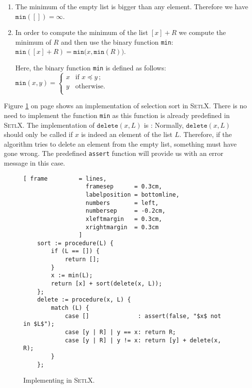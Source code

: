 \begin{enumerate}
\item The minimum of the empty list is bigger than any element.  Therefore we have 
      \\[0.2cm]
      \hspace*{1.3cm} $\mathtt{min}([]) = \infty$.
\item In order to compute the minimum of the list $[x] + R$ we compute the minimum of $R$ and
      then use the binary function \texttt{min}: \\[0.2cm]
      \hspace*{1.3cm} 
      $\mathtt{min}([x] + R) = \mathtt{min}\bigl(x, \mathtt{min}(R) \bigr)$. 

      Here, the binary function \texttt{min} is defined as follows: \\[0.2cm]
      \hspace*{1.3cm} 
      $\mathtt{min}(x,y) = \left\{
      \begin{array}{ll}
        x  & \mbox{if $x \preceq y\,$;} \\
        y  & \mbox{otherwise.} \\
      \end{array}\right.
      $
\end{enumerate}
Figure \ref{fig:selection-sort.setlx} on page \pageref{fig:selection-sort.setlx} shows an
implementation of selection sort in \textsc{SetlX}.  There is no need to implement the function
\texttt{min} as this function is already predefined in \textsc{SetlX}. 
The implementation of $\mathtt{delete}(x,L)$ is :  Normally, $\mathtt{delete}(x, L)$
should only be called if $x$ is indeed an element of the list $L$.   Therefore, if the algorithm tries 
to delete an element from the empty list, something must have gone wrong.  The predefined \texttt{assert}
function will provide us with an error message in this case.


\begin{figure}[!ht]
  \centering
\begin{Verbatim}[ frame         = lines, 
                  framesep      = 0.3cm, 
                  labelposition = bottomline,
                  numbers       = left,
                  numbersep     = -0.2cm,
                  xleftmargin   = 0.3cm,
                  xrightmargin  = 0.3cm
                ]
    sort := procedure(L) {
        if (L == []) {
            return [];
        }
        x := min(L);
        return [x] + sort(delete(x, L));
    };
    delete := procedure(x, L) {
        match (L) {
            case []              : assert(false, "$x$ not in $L$");
            case [y | R] | y == x: return R;
            case [y | R] | y != x: return [y] + delete(x, R);
        }
    };
\end{Verbatim}
\vspace*{-0.3cm}
  \caption{Implementing  in \textsc{SetlX}.}
  \label{fig:selection-sort.setlx}
\end{figure}

